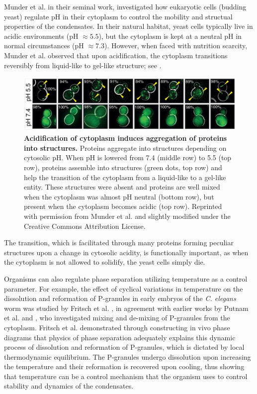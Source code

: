 Munder et al. \cite{Munder2016} in their seminal work, investigated how eukaryotic cells (budding yeast) regulate pH in their cytoplasm to control the mobility and structual properties of the condensates.
In their natural habitat, yeast cells typically live in acidic environments (pH $\approx 5.5$), but the cytoplasm is kept at a neutral pH in normal circumstances (pH $\approx 7.3$).
However, when faced with nutrition scarcity,
Munder et al. observed that upon acidification, the cytoplasm transitions reversibly from liquid-like to gel-like structure; see .
\begin{figure}[tb]
\centering
\includegraphics[scale=0.53]{MainContent/BioFigures/ph_change.pdf}
\caption{\textbf{Acidification of cytoplasm induces aggregation of proteins into structures.}
Proteins aggregate into structures depending on cytosolic pH.
When pH is lowered from 7.4 (middle row) to 5.5 (top row), proteins assemble into structures (green dots, top row) and help the transition of the cytoplasm from a liquid-like to a gel-like entity.
These structures were absent and proteins are well mixed when the cytoplasm was almost pH neutral (bottom row), but present when the cytoplasm becomes acidic (top row).
Reprinted with permission from Munder et al. \cite{Munder2016} and slightly modified under the Creative Commons Attribution License.
}
\label{fig:pH_change}
\end{figure}
The transition, which is facilitated through many proteins forming peculiar structures upon a change in cytosolic acidity, is functionally important, as when the cytoplasm is not allowed to solidify, the yeast cells simply die.

Organisms can also regulate phase separation utilizing temperature as a control parameter.
For example, the effect of cyclical variations in temperature on the dissolution and reformation of P-granules in early embryos of the \textit{C. elegans} worm was studied by Fritsch et al. \cite{Fritsch2021}, in agreement with earlier works by Putnam et al. \cite{Putnam2019} and \cite{Andresphdthesis2016}, who investigated mixing and de-mixing of P-granules from the cytoplasm.
Fritsch et al. \cite{Fritsch2021} demonstrated through constructing in vivo phase diagrams that physics of phase separation adequately explains this dynamic process of dissolution and reformation of P-granules, which is dictated by local thermodynamic equilibrium.
The P-granules undergo dissolution upon increasing the temperature and their reformation is recovered upon cooling, thus showing that temperature can be a control mechanism that the organism uses to control stability and dynamics of the condensates.

